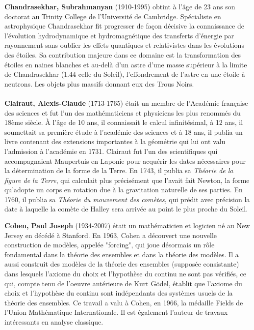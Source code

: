 \textbf{Chandrasekhar, Subrahmanyan} (1910-1995) obtint à l'âge de 23 ans son doctorat au Trinity College de l'Université de Cambridge. Spécialiste en astrophysique Chandrasekhar fit progresser de façon décisive la connaissance de l'évolution hydrodynamique et hydromagnétique des transferts d'énergie par rayonnement sans oublier les effets quantiques et relativistes dans les évolutions des étoiles. Sa contribution majeure dans ce domaine est la transformation des étoiles en naines blanches et au-delà d'un astre d'une masse supérieur à la limite de Chandrasekhar ($1.44$ celle du Soleil), l'effondrement de l'astre en une étoile à neutrons. Les objets plus massifs donnant eux des Trous Noirs.\\\\

\textbf{Clairaut, Alexis-Claude} (1713-1765) était un membre de l'Académie française des sciences et fut l'un des mathématiciens et physiciens les plus renommés du 18ème siècle. À l'âge de 10 ans, il connaissait le calcul infinitésimal, à 12 ans, il soumettait sa première étude à l'académie des sciences et à 18 ans, il publia un livre contenant des extensions importantes à la géométrie qui lui ont valu l'admission à l'académie en 1731. Clairaut fut l'un des scientifiques qui accompagnaient Maupertuis en Laponie pour acquérir les dates nécessaires pour la détermination de la forme de la Terre. En 1743, il publia sa \textit{Théorie de la figure de la Terre}, qui calculait plus précisément que l'avait fait Newton, la forme qu'adopte un corps en rotation due à la gravitation naturelle de ses parties. En 1760, il publia sa\textit{ Théorie du mouvement des comètes}, qui prédit avec précision la date à laquelle la comète de Halley sera arrivée au point le plus proche du Soleil.

\textbf{Cohen, Paul Joseph} (1934-2007) était un mathématicien et logicien né au New Jersey en décédé à Stanford. En 1963, Cohen a découvert une nouvelle construction de modèles, appelée "forcing", qui joue désormais un rôle fondamental dans la théorie des ensembles et dans la théorie des modèles. Il a aussi construit des modèles de la théorie des ensembles (supposée consistante) dans lesquels l'axiome du choix et l'hypothèse du continu ne sont pas vérifiés, ce qui, compte tenu de l'oeuvre antérieure de Kurt Gödel, établit que l'axiome du choix et l'hypothèse du continu sont indépendants des systèmes usuels de la théorie des ensembles. Ce travail a valu à Cohen, en 1966, la médaille Fields de l'Union Mathématique Internationale. Il est également l'auteur de travaux intéressants en analyse classique.

